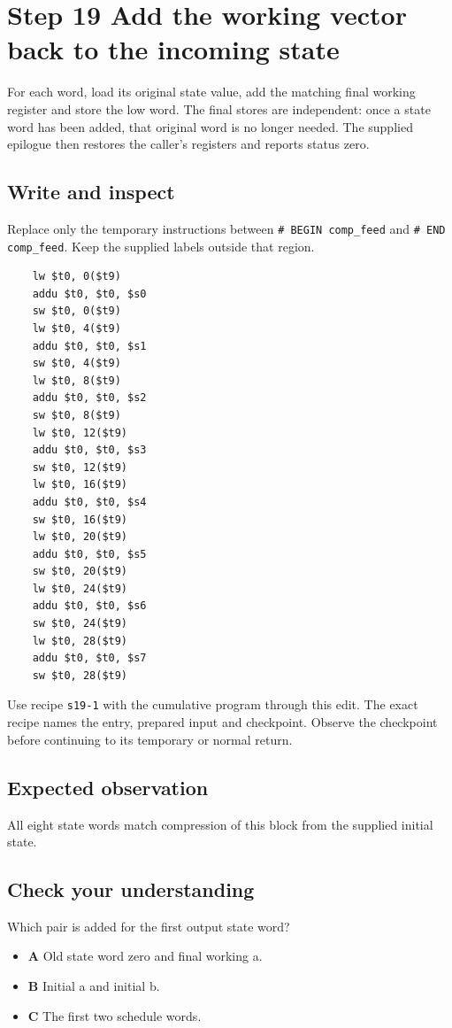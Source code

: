 \section{Step 19 Add the working vector back to the incoming state}\label{sha-s19}

For each word, load its original state value, add the matching final working register and store the low word. The final stores are independent: once a state word has been added, that original word is no longer needed. The supplied epilogue then restores the caller's registers and reports status zero.

\subsection{Write and inspect}
Replace only the temporary instructions between \texttt{\# BEGIN comp\_feed} and \texttt{\# END comp\_feed}. Keep the supplied labels outside that region.

\begin{verbatim}
    lw $t0, 0($t9)
    addu $t0, $t0, $s0
    sw $t0, 0($t9)
    lw $t0, 4($t9)
    addu $t0, $t0, $s1
    sw $t0, 4($t9)
    lw $t0, 8($t9)
    addu $t0, $t0, $s2
    sw $t0, 8($t9)
    lw $t0, 12($t9)
    addu $t0, $t0, $s3
    sw $t0, 12($t9)
    lw $t0, 16($t9)
    addu $t0, $t0, $s4
    sw $t0, 16($t9)
    lw $t0, 20($t9)
    addu $t0, $t0, $s5
    sw $t0, 20($t9)
    lw $t0, 24($t9)
    addu $t0, $t0, $s6
    sw $t0, 24($t9)
    lw $t0, 28($t9)
    addu $t0, $t0, $s7
    sw $t0, 28($t9)
\end{verbatim}

Use recipe \texttt{s19-1} with the cumulative program through this edit. The exact recipe names the entry, prepared input and checkpoint. Observe the checkpoint before continuing to its temporary or normal return.

\subsection{Expected observation}
All eight state words match compression of this block from the supplied initial state.

\subsection{Check your understanding}
Which pair is added for the first output state word?

\begin{itemize}
  \item \textbf{A} Old state word zero and final working a.
  \item \textbf{B} Initial a and initial b.
  \item \textbf{C} The first two schedule words.
\end{itemize}

